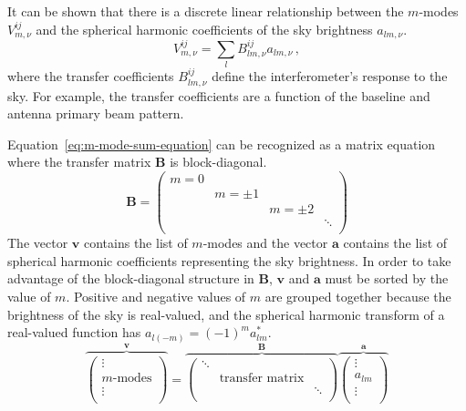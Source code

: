 \documentclass[twocolumn]{aastex61}
\renewcommand{\b}{\pmb}
\begin{document}
It can be shown that there is a discrete linear relationship between the $m$-modes $V^{ij}_{m,\nu}$
and the spherical harmonic coefficients of the sky brightness $a_{lm,\nu}$.
\begin{equation}\label{eq:m-mode-sum-equation}
    V^{ij}_{m,\nu} = \sum_l B^{ij}_{lm,\nu} a_{lm,\nu}\,,
\end{equation}
where the transfer coefficients $B^{ij}_{lm,\nu}$ define the interferometer's response to the sky.
For example, the transfer coefficients are a function of the baseline and antenna primary beam
pattern.

Equation~\ref{eq:m-mode-sum-equation} can be recognized as a matrix equation where the transfer
matrix $\b B$ is block-diagonal.
\begin{equation}
    \b B = \left(\begin{array}{cccc}
        m = 0 &&& \\
              & m=\pm1 && \\
              && m=\pm2 & \\
              &&& \ddots \\
    \end{array}\right)
\end{equation}
The vector $\b v$ contains the list of $m$-modes and the vector $\b a$ contains the list of
spherical harmonic coefficients representing the sky brightness. In order to take advantage of the
block-diagonal structure in $\b B$, $\b v$ and $\b a$ must be sorted by the value of $m$. Positive
and negative values of $m$ are grouped together because the brightness of the sky is real-valued,
and the spherical harmonic transform of a real-valued function has $a_{l(-m)} = (-1)^m a_{lm}^*$.
\begin{equation}\label{eq:m-mode-matrix-equation}
    \overbrace{\left(
        \begin{array}{c}
            \vdots \\
            m\text{-modes} \\
            \vdots \\
        \end{array}
    \right)}^{\b v}
    =
    \overbrace{\left(
        \begin{array}{ccc}
            \ddots & & \\
            & \text{transfer matrix} & \\
            & & \ddots \\
        \end{array}
    \right)}^{\b B}
    \overbrace{\left(
        \begin{array}{c}
            \vdots \\
            a_{lm} \\
            \vdots \\
        \end{array}
    \right)}^{\b a}
\end{equation}
\end{document}
